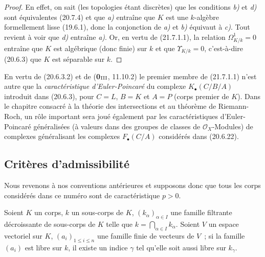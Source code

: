 \begin{proof}
En effet, on sait (les topologies étant discrètes) que les conditions \emph{b)} et
\emph{d)} sont équivalentes (20.7.4) et que \emph{a)} entraîne que $K$ est une
$k$-algèbre formellement lisse (19.6.1), donc la conjonction de \emph{a)} et \emph{b)}
équivaut à \emph{c)}. Tout revient à voir que \emph{d)} entraîne \emph{a)}. Or, en vertu de
(21.7.1.1), la relation $\Omega^1_{K/k}=0$ entraîne que $K$ est algébrique
(donc finie) sur $k$ et que $\Upsilon_{K/k}=0$, c'est-à-dire (20.6.3) que
$K$ est séparable sur $k$.
\end{proof}

\begin{remark}[21.7.5]
\label{0.21.7.5-fr}
En vertu de (20.6.3.2) et de (\textbf{0}$_{\rm III}$, 11.10.2) le premier membre de
(21.7.1.1) n'est autre que la \emph{caractéristique d'Euler-Poincaré} du
complexe $K_\bullet(C/B/A)$ introduit dans (20.6.3), pour $C=L$, $B=K$ et
$A=P$ (corps premier de $K$). Dans le chapitre consacré à la théorie des
intersections et au théorème de Riemann-Roch, un rôle important sera joué
également par les caractéristiques d'Euler-Poincaré généralisées (à valeurs
dans des groupes de classes de $\mathcal O_X$-Modules) de complexes
généralisant les complexes $F_\bullet(C/A)$ considérés dans (20.6.22).
\end{remark}

\subsection{Critères d'admissibilité}
\label{subsection:0.21.8-fr}

Nous revenons à nos conventions antérieures et supposons donc que tous les
corps considérés dans ce numéro sont de caractéristique $p>0$.

\begin{lemma}[21.8.1]
\label{0.21.8.1-fr}
Soient $K$ un corps, $k$ un sous-corps de $K$, $(k_\alpha)_{\alpha\in I}$ une
famille filtrante décroissante de sous-corps de $K$ telle que
$k=\bigcap_{\alpha\in I}k_\alpha$. Soient $V$ un espace vectoriel sur $K$,
$(a_i)_{1\leqslant i\leqslant n}$
une famille finie de vecteurs de $V$~; si la
famille $(a_i)$ est libre sur $k$, il existe un indice $\gamma$ tel qu'elle
soit aussi libre sur $k_\gamma$.
\end{lemma}

